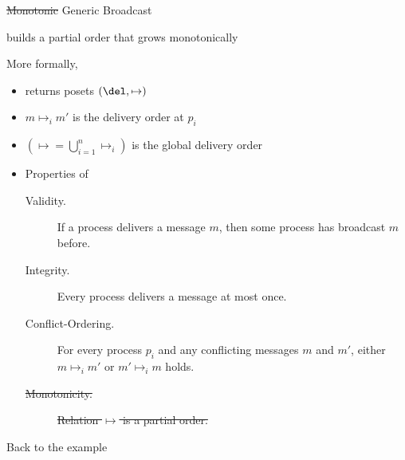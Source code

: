 \begin{frame}{\sout{Monotonic} Generic Broadcast}

  \SYS builds a partial order that grows monotonically

  \bigskip

  More formally,
  \begin{itemize}
  \item \SYS returns posets $(\del,\mapsto)$
  \item $m \mapsto_i m'$ is the delivery order at $p_i$ 
  \item $({\mapsto} = \bigcup_{i=1}^n {\mapsto_i})$ is the global delivery order
  \item Properties of \SYS
    \begin{description}
    \item [Validity.] If a process delivers a message $m$, then some process has broadcast $m$ before.
    \item [Integrity.] Every process delivers a message at most once.
    \item [Conflict-Ordering.] For every process $p_i$ and any conflicting messages $m$ and $m'$, either $m \mapsto_i m'$ or $m' \mapsto_i m$ holds.
    \item [\sout{Monotonicity.}] \sout{Relation $\mapsto$ is a partial order.}
    \end{description}
  \end{itemize}
  
\end{frame}

\begin{frame}{Back to the example}

  \hspace{4em}%
  
  
\end{frame}
